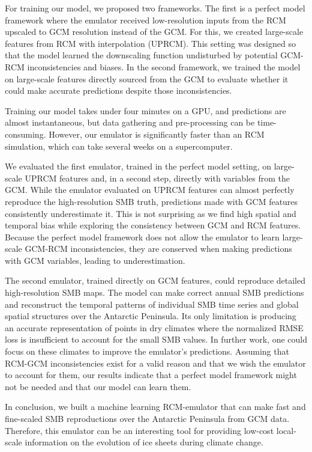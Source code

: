 \documentclass[a4paper,11pt,oneside]{report}
\begin{document}
For training our model, we proposed two frameworks. The first is a perfect model framework where the emulator received low-resolution inputs from the RCM upscaled to GCM resolution instead of the GCM. For this, we created large-scale features from RCM with interpolation (UPRCM). This setting was designed so that the model learned the downscaling function undisturbed by potential GCM-RCM inconsistencies and biases. In the second framework, we trained the model on large-scale features directly sourced from the GCM to evaluate whether it could make accurate predictions despite those inconsistencies. 

Training our model takes under four minutes on a GPU, and predictions are almost instantaneous, but data gathering and pre-processing can be time-consuming. However, our emulator is significantly faster than an RCM simulation, which can take several weeks on a supercomputer. 

We evaluated the first emulator, trained in the perfect model setting, on large-scale UPRCM features and, in a second step, directly with variables from the GCM. While the emulator evaluated on UPRCM features can almost perfectly reproduce the high-resolution SMB truth, predictions made with GCM features consistently underestimate it. This is not surprising as we find high spatial and temporal bias while exploring the consistency between GCM and RCM features. Because the perfect model framework does not allow the emulator to learn large-scale GCM-RCM inconsistencies, they are conserved when making predictions with GCM variables, leading to underestimation. 

The second emulator, trained directly on GCM features, could reproduce detailed high-resolution SMB maps. The model can make correct annual SMB predictions and reconstruct the temporal patterns of individual SMB time series and global spatial structures over the Antarctic Peninsula. Its only limitation is producing an accurate representation of points in dry climates where the normalized RMSE loss is insufficient to account for the small SMB values. In further work, one could focus on these climates to improve the emulator's predictions. Assuming that RCM-GCM inconsistencies exist for a valid reason and that we wish the emulator to account for them, our results indicate that a perfect model framework might not be needed and that our model can learn them.  


In conclusion, we built a machine learning RCM-emulator that can make fast and fine-scaled SMB reproductions over the Antarctic Peninsula from GCM data. Therefore, this emulator can be an interesting tool for providing low-cost local-scale information on the evolution of ice sheets during climate change. 
\end{document}

